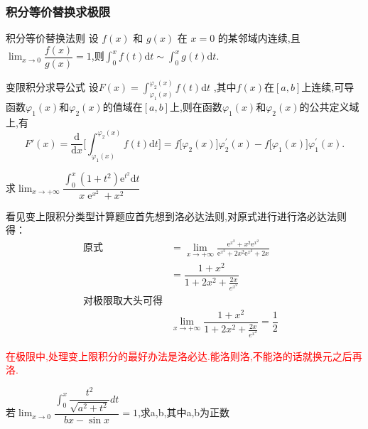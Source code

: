 \documentclass[8pt a4paper, oneside, UTF8]{ctexbook}
\begin{document}
\begin{sloppypar}
    \subsubsection{积分等价替换求极限}
    \begin{defn}{积分等价替换法则}{}
        设 $f(x)$ 和 $g(x)$ 在 $x=0$ 的某邻域内连续,且$\operatorname*{lim}_{x\rightarrow0}\dfrac{f(x)}{g(x)}=1$,则$\int_{0}^{x}f(t)\mathrm{d}t\sim\int_{0}^{x}g(t)\mathrm{d}t.$ \label{BSXJF1}
    \end{defn}
    \begin{defn}{变限积分求导公式}{}
        设$F( x) = \int _{\varphi_1( x) }^{\varphi_2( x) }f( t) $d$t$ ,其中$f(x)$在$[a,b]$上连续,可导函数$\varphi_1(x)$和$\varphi_2(x)$的值域在$[a,b]$上,则在函数$\varphi_1(x)$和$\varphi_2(x)$的公共定义域上,有
        $$
        F'(x)=\frac{\mathrm{d}}{\mathrm{d}x}\biggl[\int_{\varphi_{1}(x)}^{\varphi_{2}(x)}f(t)\mathrm{d}t\biggr]=f\bigl[\varphi_{2}(x)\bigr]\varphi_{2}^{\prime}(x)-f\bigl[\varphi_{1}(x)\bigr]\varphi_{1}^{\prime}(x).
        $$
    \end{defn}
    \begin{problem}
        求$\lim_{x\to+\infty}\dfrac{\int_0^x(1+t^2)\mathrm{e}^{t^2}\mathrm{d}t}{x\operatorname{e}^{x^2}+x^2}$
    \end{problem}
    \begin{solution}
        看见变上限积分类型计算题应首先想到洛必达法则,对原式进行进行洛必达法则得：
            \begin{align*}
                \text{原式} & =\lim_{x\to+\infty}\frac{\mathrm{e}^{x^2}+{x^2\mathrm{e}^{x^2}}}{\mathrm{e}^{x^2}+2x^2\mathrm{e}^{x^2}+2x}  & \\
                & =\dfrac{1+x^2}{1+2x^2+\frac{2x}{e^{x^2}}} & \\
                \text{对极限取大头可得} & \\
                & \lim_{x\to +\infty} \dfrac{1+x^2}{1+2x^2+\frac{2x}{e^{x^2}}} = \dfrac{1}{2} 
            \end{align*}
    \end{solution}
    \begin{note}
    \textcolor{red}{在极限中,处理变上限积分的最好办法是洛必达.能洛则洛,不能洛的话就换元之后再洛.}
    \end{note}
    \begin{problem}
        若$\operatorname*{lim}_{x \to 0}\dfrac{\int_{0}^{x}\dfrac{t^{2}}{\sqrt{a^{2}+t^{2}}}dt}{bx-\sin x}=1$,求a,b,其中a,b为正数
    \end{problem}
    \begin{solution}

\end{solution}
\end{sloppypar}
\end{document}
